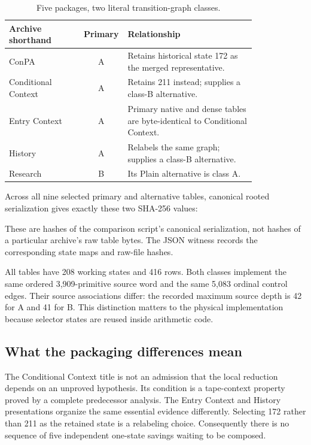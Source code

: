 \documentclass[11pt,a4paper]{article}
\begin{document}
\begin{table}[htbp]
\centering\small
\begin{tabular}{@{}p{0.30\linewidth}cp{0.52\linewidth}@{}}
\toprule
Archive shorthand & Primary & Relationship\\
\midrule
ConPA & A & Retains historical state 172 as the merged representative.\\
Conditional Context & A & Retains 211 instead; supplies a class-B alternative.\\
Entry Context & A & Primary native and dense tables are byte-identical to Conditional Context.\\
History & A & Relabels the same graph; supplies a class-B alternative.\\
Research & B & Its Plain alternative is class A.\\
\bottomrule
\end{tabular}
\caption{Five packages, two literal transition-graph classes.}
\label{tab:comparison}
\end{table}

Across all nine selected primary and alternative tables, canonical rooted
serialization gives exactly these two SHA-256 values:
\begin{description}[font=\normalfont\bfseries]
\item[Class A:] 
\item[Class B:] 
\end{description}
These are hashes of the comparison script's canonical serialization, not
hashes of a particular archive's raw table bytes. The JSON witness records
the corresponding state maps and raw-file hashes.

All tables have 208 working states and 416 rows. Both classes implement the
same ordered 3,909-primitive source word and the same 5,083 ordinal control
edges. Their source associations differ: the recorded maximum source depth
is 42 for A and 41 for B. This distinction matters to the physical
implementation because selector states are reused inside arithmetic code.

\subsection{What the packaging differences mean}

The Conditional Context title is not an admission that the local reduction
depends on an unproved hypothesis. Its condition is a tape-context property
proved by a complete predecessor analysis. The Entry Context and History
presentations organize the same essential evidence differently. Selecting
172 rather than 211 as the retained state is a relabeling choice. Consequently
there is no sequence of five independent one-state savings waiting to be
composed.
\end{document}
